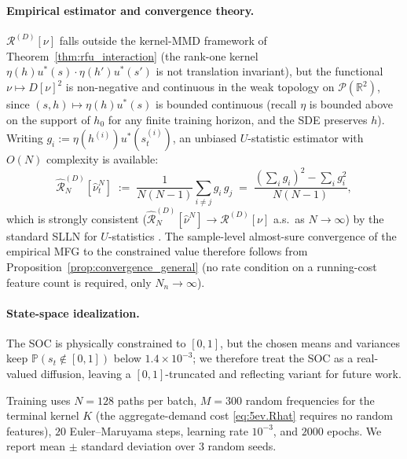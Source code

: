 \documentclass[11pt,leqno]{article}
\theoremstyle{plain}
\theoremstyle{remark}
\theoremstyle{definition}
\numberwithin{equation}{section}
\numberwithin{figure}{section}
\numberwithin{table}{section}
\numberwithin{algorithm}{section}
\newcommand{\RR}{\mathbb{R}}
\newcommand{\cP}{\mathcal{P}}
\begin{document}
\paragraph{Empirical estimator and convergence theory.}
$\mathcal{R}^{(D)}[\nu]$ falls outside the kernel-MMD framework of Theorem~\ref{thm:rfu_interaction}
(the rank-one kernel $\eta(h)u^{\!*}(s)\cdot\eta(h')u^{\!*}(s')$ is not translation invariant),
but the functional $\nu\mapsto D[\nu]^2$ is non-negative and continuous in the weak topology on $\cP(\RR^2)$,
since $(s,h)\mapsto \eta(h)u^{\!*}(s)$ is bounded continuous (recall $\eta$ is bounded above on the support of $h_0$ for any finite training horizon, and the SDE preserves $h$).
Writing $g_i:=\eta(h^{(i)})u^{\!*}(s_t^{(i)})$, an unbiased $U$-statistic estimator with $O(N)$ complexity is available:
\begin{equation}\label{eq:5ev.Rhat}
 \hat{\mathcal{R}}^{(D)}_{N}[\hat\nu^N_t]
 \;:=\;\frac{1}{N(N-1)}\sum_{i\neq j}g_i\,g_j
 \;=\;\frac{(\sum_i g_i)^2-\sum_i g_i^2}{N(N-1)},
\end{equation}
which is strongly consistent ($\hat{\mathcal{R}}^{(D)}_{N}[\hat\nu^N]\to \mathcal{R}^{(D)}[\nu]$ a.s.\ as $N\to\infty$)
by the standard SLLN for $U$-statistics \cite[Section~5.4]{ser:1980}.
The sample-level almost-sure convergence of the empirical MFG to the constrained value
therefore follows from Proposition~\ref{prop:convergence_general}
(no rate condition on a running-cost feature count is required, only $N_n\to\infty$).

\paragraph{State-space idealization.}
The SOC is physically constrained to $[0,1]$, but the chosen means and variances keep $\mathbb{P}(s_t\notin[0,1])$ below $1.4\times 10^{-3}$;
we therefore treat the SOC as a real-valued diffusion, leaving a $[0,1]$-truncated and reflecting variant for future work.

Training uses $N=128$ paths per batch, $M=300$ random frequencies for the terminal kernel $K$
(the aggregate-demand cost \eqref{eq:5ev.Rhat} requires no random features),
$20$ Euler--Maruyama steps, learning rate $10^{-3}$, and $2000$ epochs.
We report mean $\pm$ standard deviation over $3$ random seeds.
\end{document}
